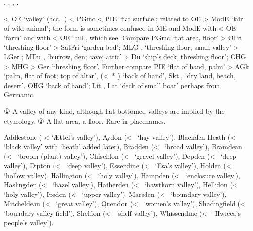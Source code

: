\documentclass[12pt,letterpaper,oneside,article,draft]{memoir}
\begin{document}
\begin{Lemma}
\begin{Also}
	, , , , 
\end{Also}
\begin{Etymology}
	< OE  ‘valley’ (acc.\ ) < PGmc  < PIE  ‘flat surface’;
		related to OE  > ModE  ‘lair of wild animal’;
		the form  is sometimes confused in ME and ModE with  < OE  ‘farm’
		and with  < OE  ‘hill’, which see.
	Compare
	PGmc  ‘flat area, floor’ > 
		OFri  ‘threshing floor’ > SatFri  ‘garden bed’;
		MLG ,  ‘threshing floor; small valley’ > LGer ;
		MDu ,  ‘burrow, den; cave; attic’ > Du  ‘ship’s deck, threshing floor’;
		OHG  > MHG  > Ger  ‘threshing floor’.
	Further compare
	PIE  ‘flat of hand, palm’ > AGk   ‘palm, flat of foot; top of altar’,
		  (<~* ) ‘back of hand’,
		Skt  ,   ‘dry land, beach, desert’,
		OHG  ‘back of hand’;
	Lit , Lat  ‘deck of small boat’ perhaps from Germanic.
\end{Etymology}
\begin{Definitions}
	① A valley of any kind, although flat bottomed valleys are implied by the etymology.
	② A flat area, a floor. Rare in placenames.
\end{Definitions}
\begin{Examples}
	Addlestone ( <  ‘Ættel’s valley’),
	Aydon (<~ ‘hay valley’),
	Blackden Heath (<~ ‘black valley’ with  ‘heath’ added later),
	Bradden (<~ ‘broad valley’),
	Bramdean (<~ ‘broom (plant) valley’),
	Chiseldon (<~ ‘gravel valley’),
	Depden (<~ ‘deep valley’),
	Dipton (<~ ‘deep valley’),
	Essendine (<~ ‘Ēsa’s valley’),
	Holden (<~ ‘hollow valley),
	Hallington (<~ ‘holy valley’),
	Hampden (<~ ‘enclosure valley’),
	Haslingden (<~ ‘hazel valley’),
	Hatherden (<~ ‘hawthorn valley’),
	Hellidon (<~ ‘holy valley’),
	Ipsden (<~ ‘upper valley’),
	Marsden (<~ ‘boundary valley’),
	Mitcheldean (<~ ‘great valley’),
	Quendon (<~ ‘women’s valley’),
	Shadingfield (<~ ‘boundary valley field’),
	Sheldon (<~ ‘shelf valley’),
	Whissendine (<~ ‘Hwicca’s people’s valley’).
\end{Examples}
\end{Lemma}
\end{document}
